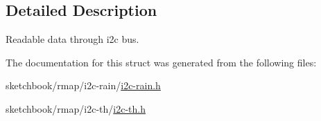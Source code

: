 \subsection{Detailed Description}
Readable data through i2c bus. 

The documentation for this struct was generated from the following files\+:\begin{DoxyCompactItemize}
\item 
sketchbook/rmap/i2c-\/rain/\hyperlink{i2c-rain_8h}{i2c-\/rain.\+h}\item 
sketchbook/rmap/i2c-\/th/\hyperlink{i2c-th_8h}{i2c-\/th.\+h}\end{DoxyCompactItemize}
